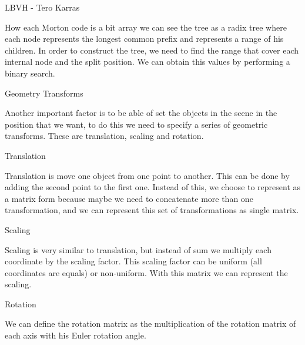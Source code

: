 \documentclass{beamer}
\begin{document}
\begin{frame}{LBVH - Tero Karras}

How each Morton code is a bit array we can see the tree as a radix tree where each node represents the longest common prefix and represents a range of his children. In order to construct the tree, we need to find the range that cover each internal node and the split position. We can obtain this values by performing a binary search.

\end{frame}

\begin{frame}{Geometry Transforms}

Another important factor is to be able of set the objects in the scene in the position that we want, to do this we need to specify a series of geometric transforms. These are translation, scaling and rotation.

\end{frame}

\begin{frame}{Translation}

Translation is move one object from one point to another. This can be done by adding the second point to the first one. Instead of this, we choose to represent as a matrix form because maybe we need to concatenate more than one transformation, and we can represent this set of transformations as single matrix.

\end{frame}

\begin{frame}{Scaling}

Scaling is very similar to translation, but instead of sum we multiply each coordinate by the scaling factor. This scaling factor can be uniform (all coordinates are equals) or non-uniform. With this matrix we can represent the scaling.

\end{frame}

\begin{frame}{Rotation}

We can define the rotation matrix as the multiplication of the rotation matrix of each axis with his Euler rotation angle.

\end{frame}
\end{document}
